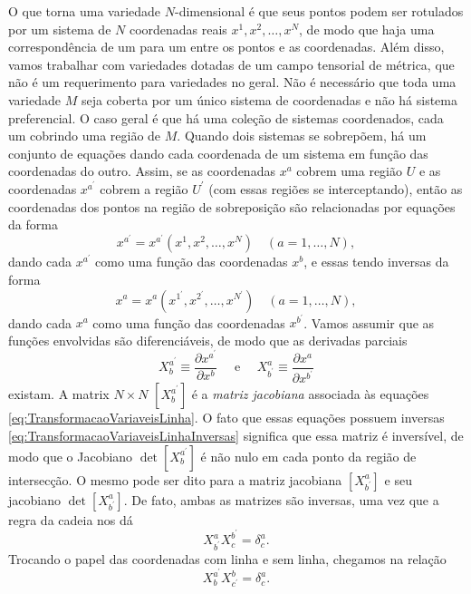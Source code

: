 O que torna uma variedade $N$-dimensional é que seus pontos podem ser rotulados por um sistema de $N$ coordenadas reais $x^1,x^2,\ldots,x^N$, de modo que haja uma correspondência de um para um entre os pontos e as coordenadas. Além disso, vamos trabalhar com variedades dotadas de um campo tensorial de métrica, que não é um requerimento para variedades no geral. Não é necessário que toda uma variedade $M$ seja coberta por um único sistema de coordenadas e não há sistema preferencial. O caso geral é que há uma coleção de sistemas coordenados, cada um cobrindo uma região de $M$. Quando dois sistemas se sobrepõem, há um conjunto de equações dando cada coordenada de um sistema em função das coordenadas do outro. Assim, se as coordenadas $x^a$ cobrem uma região $U$ e as coordenadas $x^{a^\prime}$ cobrem a região $U^\prime$ (com essas regiões se interceptando), então as coordenadas dos pontos na região de sobreposição são relacionadas por equações da forma
\begin{equation}\label{eq:TransformacaoVariaveisLinha}
	x^{a^\prime}=x^{a^\prime}\left(x^{1}, x^{2}, \ldots, x^{N}\right) \quad(a=1, \ldots, N) ,
\end{equation}
dando cada $x^{a^\prime}$ como uma função das coordenadas $x^b$, e essas tendo inversas da forma
\begin{equation}\label{eq:TransformacaoVariaveisLinhaInversas}
	x^{a}=x^{a}\left(x^{1^\prime}, x^{2^\prime}, \ldots, x^{N^{\prime}}\right) \quad(a=1, \ldots, N),
\end{equation}
dando cada $x^a$ como uma função das coordenadas $x^{b^\prime}$. Vamos assumir que as funções envolvidas são diferenciáveis, de modo que as derivadas parciais
\[
	X_{b}^{a^{\prime}} \equiv \frac{\partial x^{a^{\prime}}}{\partial x^{b}} \quad \text { e } \quad X_{b^{\prime}}^{a} \equiv \frac{\partial x^{a}}{\partial x^{b^{\prime}}}
\]
existam. A matrix $N\times N$ $[X^{a^\prime}_b]$ é a \textit{matriz jacobiana} associada às equações \eqref{eq:TransformacaoVariaveisLinha}. O fato que essas equações possuem inversas \eqref{eq:TransformacaoVariaveisLinhaInversas} significa que essa matriz é inversível, de modo que o Jacobiano $\det[X^{a^\prime}_b]$ é não nulo em cada ponto da região de intersecção. O mesmo pode ser dito para a matriz jacobiana $[X^a_{b^\prime}]$ e seu jacobiano $\det[X^a_{b^\prime}]$. De fato, ambas as matrizes são inversas, uma vez que a regra da cadeia nos dá
\begin{equation}\label{eq:JacobianaInversa}
	X^a_{b^\prime}X^{b^\prime}_c=\delta^a_c.
\end{equation}
Trocando o papel das coordenadas com linha e sem linha, chegamos na relação
\begin{equation}\label{eq:JacobianaInversaLinha}
	X^{a^\prime}_bX^b_{c^\prime}=\delta^a_c .
\end{equation}

